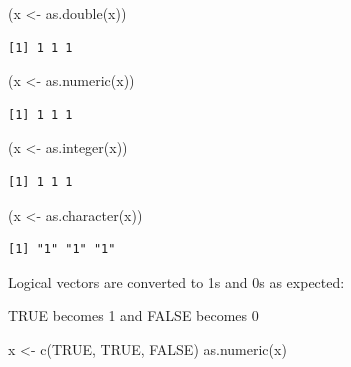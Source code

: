 \documentclass[
]{book}
\newenvironment{Shaded}{\begin{snugshade}}{\end{snugshade}}
\newcommand{\ConstantTok}[1]{\textcolor[rgb]{0.00,0.00,0.00}{#1}}
\newcommand{\FunctionTok}[1]{\textcolor[rgb]{0.00,0.00,0.00}{#1}}
\newcommand{\NormalTok}[1]{#1}
\newcommand{\OtherTok}[1]{\textcolor[rgb]{0.56,0.35,0.01}{#1}}
\begin{document}
\begin{Shaded}
\begin{Highlighting}[]
\NormalTok{(x }\OtherTok{\textless{}{-}} \FunctionTok{as.double}\NormalTok{(x))}
\end{Highlighting}
\end{Shaded}

\begin{verbatim}
[1] 1 1 1
\end{verbatim}

\begin{Shaded}
\begin{Highlighting}[]
\NormalTok{(x }\OtherTok{\textless{}{-}} \FunctionTok{as.numeric}\NormalTok{(x))}
\end{Highlighting}
\end{Shaded}

\begin{verbatim}
[1] 1 1 1
\end{verbatim}

\begin{Shaded}
\begin{Highlighting}[]
\NormalTok{(x }\OtherTok{\textless{}{-}} \FunctionTok{as.integer}\NormalTok{(x))}
\end{Highlighting}
\end{Shaded}

\begin{verbatim}
[1] 1 1 1
\end{verbatim}

\begin{Shaded}
\begin{Highlighting}[]
\NormalTok{(x }\OtherTok{\textless{}{-}} \FunctionTok{as.character}\NormalTok{(x))}
\end{Highlighting}
\end{Shaded}

\begin{verbatim}
[1] "1" "1" "1"
\end{verbatim}

Logical vectors are converted to 1s and 0s as expected:

TRUE becomes 1 and FALSE becomes 0

\begin{Shaded}
\begin{Highlighting}[]
\NormalTok{x }\OtherTok{\textless{}{-}} \FunctionTok{c}\NormalTok{(}\ConstantTok{TRUE}\NormalTok{, }\ConstantTok{TRUE}\NormalTok{, }\ConstantTok{FALSE}\NormalTok{)}
\FunctionTok{as.numeric}\NormalTok{(x)}
\end{Highlighting}
\end{Shaded}
\end{document}
